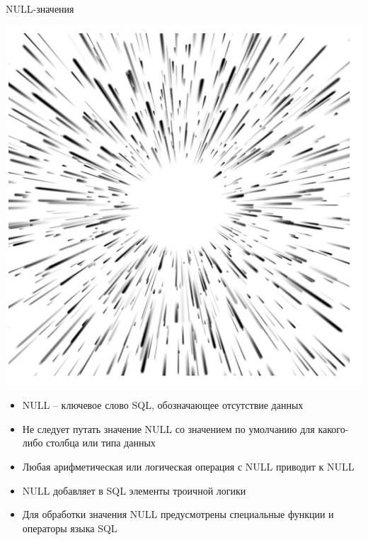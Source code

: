 \documentclass{beamer}
\begin{document}
\begin{frame}{NULL-значения}
\begin{minipage}{0.3\textwidth}
  \begin{flushleft}
	\begin{center}
		\includegraphics[scale=0.3]{images/NULL.png}
	\end{center}
  \end{flushleft}
\end{minipage}
\begin{minipage}{0.6\textwidth}
  \begin{flushright}
\begin{itemize}
\item NULL – ключевое слово SQL, обозначающее отсутствие данных
\item Не следует путать значение NULL со значением по умолчанию для какого-либо столбца или типа данных
\item Любая арифметическая или логическая операция с NULL
приводит к NULL
\item NULL добавляет в SQL элементы троичной логики
\item Для обработки значения NULL предусмотрены специальные функции и операторы языка SQL
\end{itemize}
  \end{flushright}
\end{minipage}
\end{frame}
\end{document}
